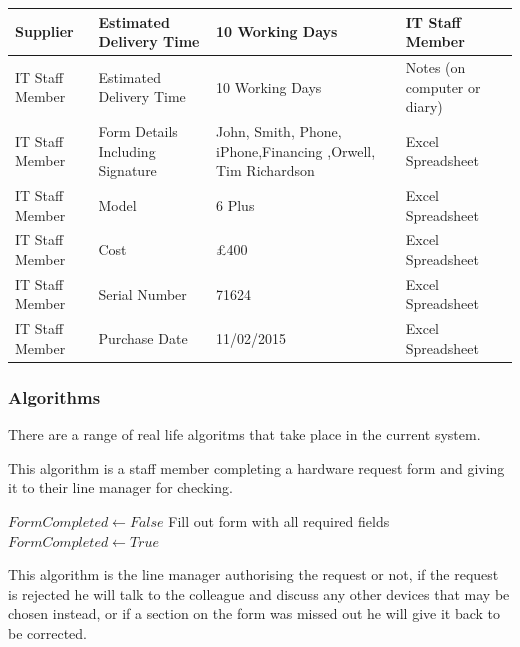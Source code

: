 \begin{center}
\begin{tabular}{|p{3cm}|p{3cm}|p{4cm}|p{3cm}|}
Supplier & Estimated Delivery Time & 10 Working Days & IT Staff Member \\ \hline
IT Staff Member & Estimated Delivery Time & 10 Working Days & Notes (on computer or diary) \\ \hline
IT Staff Member                      & Form Details Including Signature   & John, Smith, Phone, iPhone,Financing ,Orwell, Tim Richardson & Excel Spreadsheet                                   \\ \hline
IT Staff Member                             & Model                              & 6 Plus                                             & Excel Spreadsheet                                       \\ \hline
IT Staff Member                       & Cost                              & £400                                               & Excel Spreadsheet        \\ \hline
IT Staff Member                       & Serial Number                      & 71624                                          &  Excel Spreadsheet           \\ \hline
IT Staff Member                       & Purchase Date                      & 11/02/2015                                         &  Excel Spreadsheet           \\ \hline
\end{tabular}
\end{center}

\newpage
\subsubsection{Algorithms}

There are a range of real life algoritms that take place in the current system.

This algorithm is a staff member completing a hardware request form and giving it to their line manager for checking.

\begin{algorithm}[H]
\begin{algorithmic}
\State $FormCompleted  \leftarrow False$
	\State Fill out form with all required fields
	\State $FormCompleted \leftarrow True$
\Else
\EndIf
\end{algorithmic}
\end{algorithm}

This algorithm is the line manager authorising the request or not, if the request is rejected he will talk to the colleague and discuss any other devices that may be chosen instead, or if a section on the form was missed out he will give it back to be corrected.

